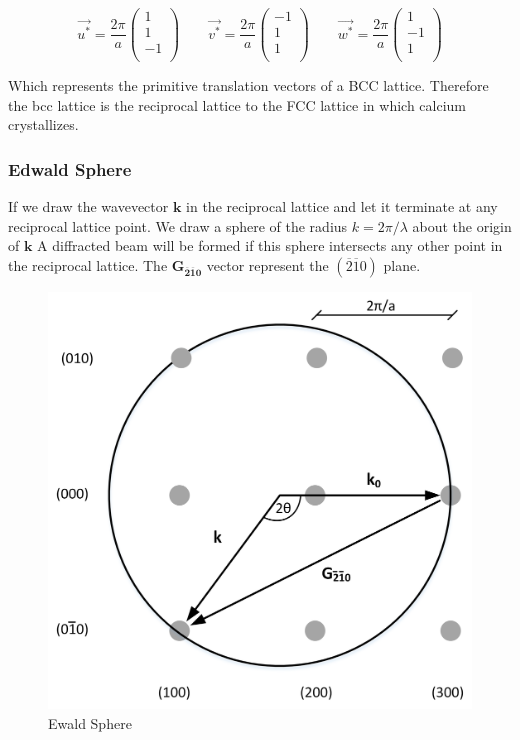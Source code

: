$$
    \vec{u^*} = \frac{2\pi}{a} \left(\begin{matrix}1\\1\\-1\\\end{matrix}\right) \qquad
    \vec{v^*} = \frac{2\pi}{a} \left(\begin{matrix}-1\\1\\1\\\end{matrix}\right) \qquad
    \vec{w^*} = \frac{2\pi}{a} \left(\begin{matrix}1\\-1\\1\\\end{matrix}\right)
$$

Which represents the primitive translation vectors of a BCC lattice.
Therefore the bcc lattice is the reciprocal lattice to the FCC lattice
in which calcium crystallizes.


\subsubsection*{Edwald Sphere}

If we draw the wavevector $\mathbf{k}$ in the reciprocal lattice and let it
terminate at any reciprocal lattice point.
We draw a sphere of the radius $k=2\pi/ \lambda$ about the origin of $\mathbf{k}$
A diffracted beam will be formed if this sphere intersects any other point in the 
reciprocal lattice.
The $\mathbf{G_{\overline{2}\overline{1}0}}$ vector represent the 
$(\overline{2}\overline{1}0)$ plane.

\begin{figure}[H]
	\centering
	\includegraphics[width=0.5\linewidth]{Graphics/Chapter2/ewald_sphere.png}
	\caption{Ewald Sphere}
	\label{fig:ewals_sphere}
\end{figure}

